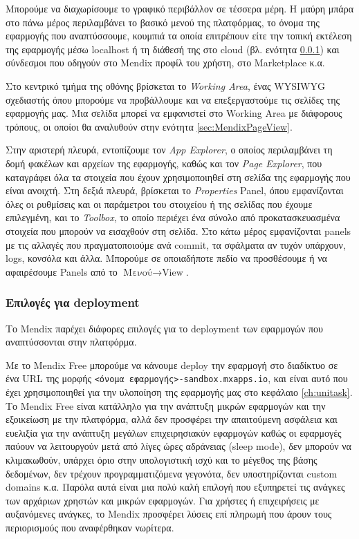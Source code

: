         Μπορούμε να διαχωρίσουμε το γραφικό περιβάλλον σε τέσσερα μέρη. Η μαύρη μπάρα στο πάνω μέρος περιλαμβάνει το βασικό μενού της πλατφόρμας, το όνομα της εφαρμογής που αναπτύσσουμε, κουμπιά τα οποία επιτρέπουν είτε την τοπική εκτέλεση της εφαρμογής μέσω localhost ή τη διάθεσή της στο cloud (βλ. ενότητα \ref{sec:MendixDeployment}) και σύνδεσμοι που οδηγούν στο Mendix προφίλ του χρήστη, στο Marketplace κ.α.

        Στο κεντρικό τμήμα της οθόνης βρίσκεται το \textit{Working Area}, ένας WYSIWYG σχεδιαστής όπου μπορούμε να προβάλλουμε και να επεξεργαστούμε τις σελίδες της εφαρμογής μας. Μια σελίδα μπορεί να εμφανιστεί στο Working Area με διάφορους τρόπους, οι οποίοι θα αναλυθούν στην ενότητα \ref{sec:MendixPageView}.

        Στην αριστερή πλευρά, εντοπίζουμε τον \textit{App Explorer}, ο οποίος περιλαμβάνει τη δομή φακέλων και αρχείων της εφαρμογής, καθώς και τον \textit{Page Explorer}, που καταγράφει όλα τα στοιχεία που έχουν χρησιμοποιηθεί στη σελίδα της εφαρμογής που είναι ανοιχτή. Στη δεξιά πλευρά, βρίσκεται το \textit{Properties} Panel, όπου εμφανίζονται όλες οι ρυθμίσεις και οι παράμετροι του στοιχείου ή της σελίδας που έχουμε επιλεγμένη, και το \textit{Toolbox}, το οποίο περιέχει ένα σύνολο από προκατασκευασμένα στοιχεία που μπορούν να εισαχθούν στη σελίδα. Στο κάτω μέρος εμφανίζονται panels με τις αλλαγές που πραγματοποιούμε ανά commit, τα σφάλματα αν τυχόν υπάρχουν, logs, κονσόλα και άλλα. Μπορούμε σε οποιαδήποτε πεδίο να προσθέσουμε ή να αφαιρέσουμε Panels από το $ \text{Μενού} \rightarrow \text{View} $. \cite{mendixDoc}

        \subsubsection{Επιλογές για deployment} \label{sec:MendixDeployment}
            Το Mendix παρέχει διάφορες επιλογές για το deployment των εφαρμογών που αναπτύσσονται στην πλατφόρμα.

            Με το Mendix Free μπορούμε να κάνουμε deploy την εφαρμογή στο διαδίκτυο σε ένα URL της μορφής \texttt{<όνομα εφαρμογής>-sandbox.mxapps.io}, και είναι αυτό που έχει χρησιμοποιηθεί για την υλοποίηση της εφαρμογής μας στο κεφάλαιο \ref{ch:unitask}. Το Mendix Free είναι κατάλληλο για την ανάπτυξη μικρών εφαρμογών και την εξοικείωση με την πλατφόρμα, αλλά δεν προσφέρει την απαιτούμενη ασφάλεια και ευελιξία για την ανάπτυξη μεγάλων επιχειρησιακύν εφαρμογών καθώς οι εφαρμογές παύουν να λειτουργούν μετά από λίγες ώρες αδράνειας (sleep mode), δεν μπορούν να κλιμακωθούν, υπάρχει όριο στην υπολογιστική ισχύ και το μέγεθος της βάσης δεδομένων, δεν τρέχουν προγραμματιζόμενα γεγονότα, δεν υποστηρίζονται custom domains κ.α. Παρόλα αυτά είναι μια πολύ καλή επιλογή που εξυπηρετεί τις ανάγκες των αρχάριων χρηστών και μικρών εφαρμογών. Για χρήστες ή επιχειρήσεις με αυξανόμενες ανάγκες, το Mendix προσφέρει λύσεις επί πληρωμή που άρουν τους περιορισμούς που αναφέρθηκαν νωρίτερα. \cite{mendixCloud}

